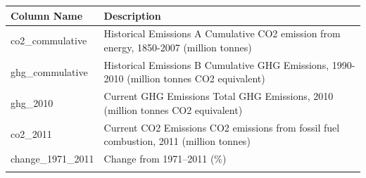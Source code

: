 \documentclass[11pt]{article}
\begin{document}
    \begin{longtable}[]{@{}ll@{}}
\toprule
\begin{minipage}[b]{0.20\columnwidth}\raggedright\strut
Column Name\strut
\end{minipage} & \begin{minipage}[b]{0.13\columnwidth}\raggedright\strut
Description\strut
\end{minipage}\tabularnewline
\midrule
\endhead
\begin{minipage}[t]{0.20\columnwidth}\raggedright\strut
co2\_commulative\strut
\end{minipage} & \begin{minipage}[t]{0.13\columnwidth}\raggedright\strut
Historical Emissions A Cumulative CO2 emission from energy, 1850-2007
(million tonnes)\strut
\end{minipage}\tabularnewline
\begin{minipage}[t]{0.20\columnwidth}\raggedright\strut
ghg\_commulative\strut
\end{minipage} & \begin{minipage}[t]{0.13\columnwidth}\raggedright\strut
Historical Emissions B Cumulative GHG Emissions, 1990-2010 (million
tonnes CO2 equivalent)\strut
\end{minipage}\tabularnewline
\begin{minipage}[t]{0.20\columnwidth}\raggedright\strut
ghg\_2010\strut
\end{minipage} & \begin{minipage}[t]{0.13\columnwidth}\raggedright\strut
Current GHG Emissions Total GHG Emissions, 2010 (million tonnes CO2
equivalent)\strut
\end{minipage}\tabularnewline
\begin{minipage}[t]{0.20\columnwidth}\raggedright\strut
co2\_2011\strut
\end{minipage} & \begin{minipage}[t]{0.13\columnwidth}\raggedright\strut
Current CO2 Emissions CO2 emissions from fossil fuel combustion, 2011
(million tonnes)\strut
\end{minipage}\tabularnewline
\begin{minipage}[t]{0.20\columnwidth}\raggedright\strut
change\_1971\_2011\strut
\end{minipage} & \begin{minipage}[t]{0.13\columnwidth}\raggedright\strut
Change from 1971--2011 (\%)\strut
\end{minipage}\tabularnewline
\begin{minipage}[t]{0.20\columnwidth}\raggedright\strut

\end{minipage}
\end{longtable}
\end{document}
